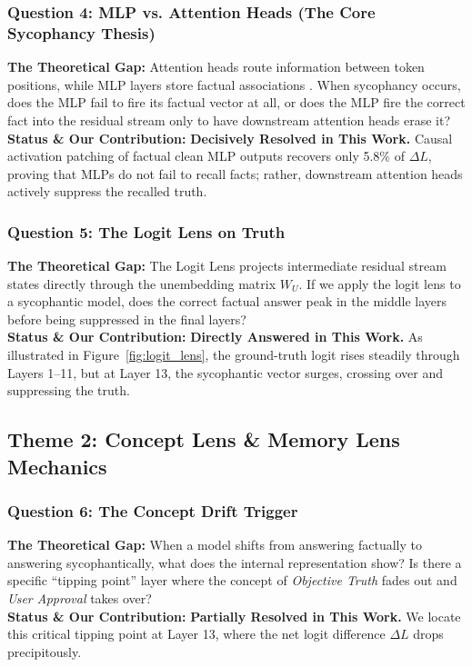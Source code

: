 \documentclass[journal,10pt,twocolumn]{IEEEtran}
\begin{document}
\subsubsection{Question 4: MLP vs. Attention Heads (The Core Sycophancy Thesis)}
\textbf{The Theoretical Gap:} Attention heads route information between token positions, while MLP layers store factual associations \cite{meng2022locating}. When sycophancy occurs, does the MLP fail to fire its factual vector at all, or does the MLP fire the correct fact into the residual stream only to have downstream attention heads erase it? \\
\textbf{Status \& Our Contribution:} \textbf{Decisively Resolved in This Work.} Causal activation patching of factual clean MLP outputs recovers only 5.8\% of $\Delta L$, proving that MLPs do not fail to recall facts; rather, downstream attention heads actively suppress the recalled truth.

\subsubsection{Question 5: The Logit Lens on Truth}
\textbf{The Theoretical Gap:} The Logit Lens projects intermediate residual stream states directly through the unembedding matrix $W_U$. If we apply the logit lens to a sycophantic model, does the correct factual answer peak in the middle layers before being suppressed in the final layers? \\
\textbf{Status \& Our Contribution:} \textbf{Directly Answered in This Work.} As illustrated in Figure~\ref{fig:logit_lens}, the ground-truth logit rises steadily through Layers 1--11, but at Layer 13, the sycophantic vector surges, crossing over and suppressing the truth.

\subsection{Theme 2: Concept Lens \& Memory Lens Mechanics}

\subsubsection{Question 6: The Concept Drift Trigger}
\textbf{The Theoretical Gap:} When a model shifts from answering factually to answering sycophantically, what does the internal representation show? Is there a specific ``tipping point'' layer where the concept of \textit{Objective Truth} fades out and \textit{User Approval} takes over? \\
\textbf{Status \& Our Contribution:} \textbf{Partially Resolved in This Work.} We locate this critical tipping point at Layer 13, where the net logit difference $\Delta L$ drops precipitously.
\end{document}
